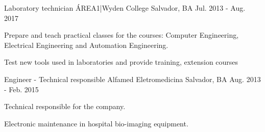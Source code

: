 \begin{cventries}
    
  \cventry
    {Laboratory technician} %
    {ÁREA1|Wyden College} %
    {Salvador, BA} %
    {Jul. 2013 - Aug. 2017} %
    {
      \begin{cvitems} %
        \item {Prepare and teach practical classes for the courses: Computer Engineering, Electrical Engineering and Automation Engineering.}
        \item {Test new tools used in laboratories and provide training, extension courses}
      \end{cvitems}
    }

  \cventry
    {Engineer - Technical responsible} %
    {Alfamed Eletromedicina} %
    {Salvador, BA} %
    {Aug. 2013 - Feb. 2015} %
    {
      \begin{cvitems} %
        \item {Technical responsible for the company.}
        \item {Electronic maintenance in hospital bio-imaging equipment.}
      \end{cvitems}
    }
    


\end{cventries}
